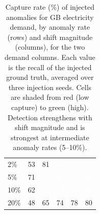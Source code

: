 \documentclass[12pt]{article}
\begin{document}
\begin{table}[H]
\begin{minipage}[t]{0.49\textwidth}
\begin{tabular}{@{}l ccccc@{}}
2\% & \cellcolor[RGB]{242,249,173}53 & \cellcolor[RGB]{93,184,96}81 & \cellcolor[RGB]{57,167,87}\textcolor{white}{86} & \cellcolor[RGB]{39,158,83}\textcolor{white}{88} & \cellcolor[RGB]{22,145,76}\textcolor{white}{91} \\
5\% & \cellcolor[RGB]{157,213,105}71 & \cellcolor[RGB]{60,168,88}\textcolor{white}{85} & \cellcolor[RGB]{25,151,79}\textcolor{white}{90} & \cellcolor[RGB]{13,128,67}\textcolor{white}{95} & \cellcolor[RGB]{27,152,80}\textcolor{white}{90} \\
10\% & \cellcolor[RGB]{205,233,131}62 & \cellcolor[RGB]{63,170,89}\textcolor{white}{85} & \cellcolor[RGB]{22,145,76}\textcolor{white}{91} & \cellcolor[RGB]{17,136,71}\textcolor{white}{93} & \cellcolor[RGB]{25,151,79}\textcolor{white}{90} \\
20\% & \cellcolor[RGB]{254,248,179}48 & \cellcolor[RGB]{191,227,122}65 & \cellcolor[RGB]{139,205,103}74 & \cellcolor[RGB]{112,193,100}78 & \cellcolor[RGB]{99,187,98}80 \\
\bottomrule
\end{tabular}
\end{minipage}
\caption{Capture rate (\%) of injected anomalies for GB electricity demand, by anomaly rate (rows) and shift magnitude (columns), for the two demand columns. Each value is the recall of the injected ground truth, averaged over three injection seeds. Cells are shaded from red (low capture) to green (high). Detection strengthens with shift magnitude and is strongest at intermediate anomaly rates (5--10\%).}
\label{tab:elec_sensitivity}
\end{table}
\end{document}
